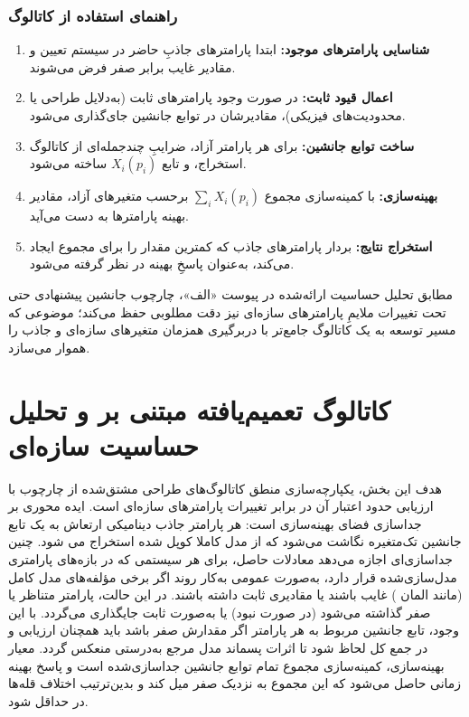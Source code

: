 
\subsubsection*{راهنمای استفاده از کاتالوگ}

\begin{enumerate}
  \item \textbf{شناسایی پارامترهای موجود:} ابتدا پارامترهای جاذبِ حاضر در سیستم تعیین و مقادیر غایب برابر صفر فرض می‌شوند.
  \item \textbf{اعمال قیود ثابت:} در صورت وجود پارامترهای ثابت (به‌دلایل طراحی یا محدودیت‌های فیزیکی)، مقادیرشان در توابع جانشین جای‌گذاری می‌شود.
  \item \textbf{ساخت توابع جانشین:} برای هر پارامتر آزاد، ضرایبِ چندجمله‌ای از کاتالوگ استخراج، و تابع $X_i(p_i)$ ساخته می‌شود.
  \item \textbf{بهینه‌سازی:} با کمینه‌سازی مجموع $\sum_i X_i(p_i)$ برحسب متغیرهای آزاد، مقادیر بهینه پارامترها به دست می‌آید.
  \item \textbf{استخراج نتایج:} بردار پارامترهای جاذب که کمترین مقدار را برای مجموع  ایجاد می‌کند، به‌عنوان پاسخِ بهینه در نظر گرفته می‌شود.
\end{enumerate}

مطابق تحلیل حساسیت ارائه‌شده در پیوست «الف»، چارچوب جانشین پیشنهادی حتی تحت تغییرات ملایمِ پارامترهای سازه‌ای نیز دقت مطلوبی حفظ می‌کند؛ موضوعی که مسیر توسعه به یک کاتالوگ جامع‌تر با دربرگیری همزمان متغیرهای سازه‌ای و جاذب را هموار می‌سازد.



\section{کاتالوگ تعمیم‌یافته مبتنی بر  و تحلیل حساسیت سازه‌ای}

هدف این بخش، یکپارچه‌سازی منطق کاتالوگ‌های طراحی مشتق‌شده از چارچوب 
 با ارزیابی حدود اعتبار آن در برابر تغییرات پارامترهای سازه‌ای است. ایده محوری 
  بر جداسازی فضای بهینه‌سازی است: هر پارامتر جاذب دینامیکی ارتعاش 
   به یک تابع جانشین تک‌متغیره نگاشت می‌شود که از مدل ‌کاملا کوپل شده استخراج می شود. چنین جداسازی‌ای اجازه می‌دهد معادلات حاصل، برای هر سیستمی که در بازه‌های پارامتری مدل‌سازی‌شده قرار دارد، به‌صورت عمومی به‌کار روند اگر برخی مؤلفه‌های مدل کامل (مانند المان 
   )
    غایب باشند یا مقادیری ثابت داشته باشند. در این حالت، پارامتر متناظر یا صفر گذاشته می‌شود (در صورت نبود) یا به‌صورت ثابت جایگذاری می‌گردد. با این وجود، تابع جانشین مربوط به هر پارامتر اگر مقدارش صفر باشد باید همچنان ارزیابی و در جمع کل لحاظ شود تا اثرات پسماند مدل مرجع به‌درستی منعکس گردد. معیار بهینه‌سازی، کمینه‌سازی مجموع تمام توابع جانشین جداسازی‌شده است و پاسخ بهینه زمانی حاصل می‌شود که این مجموع به نزدیک صفر میل کند و بدین‌ترتیب اختلاف قله‌ها در 
     حداقل شود.

